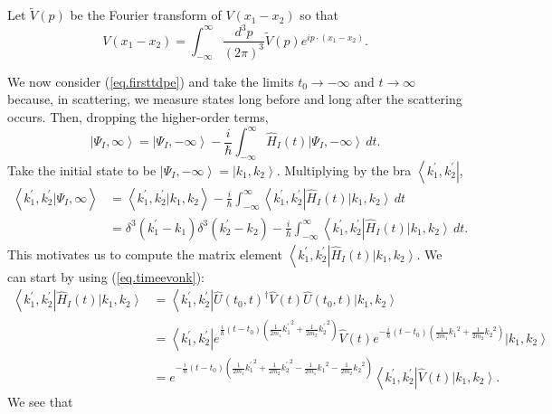 \documentclass[11pt]{article}
\newcommand{\bra}[1]{\left\langle#1\right|}
\newcommand{\ket}[1]{\left|#1\right\rangle}
\newcommand{\braket}[2]{\left\langle#1|#2\right\rangle}
\newcommand{\op}[1]{\hat{#1}}
\theoremstyle{theorem}
\theoremstyle{remark}
\theoremstyle{step}
\theoremstyle{gap}
\begin{document}
Let \(\widetilde{V}(p)\) be the Fourier transform of \(V(x_1 - x_2)\) so that
\begin{equation}
\label{eq.ftV}
V(x_1 - x_2) = \int_{-\infty}^{\infty} \frac{d^3 p}{(2 \pi)^3} \widetilde{V}(p) e^{ip\cdot(x_1 - x_2)}.
\end{equation}

We now consider (\ref{eq.firsttdpe}) and take the limits \(t_0 \to -\infty\) and \(t \to \infty\) because, in scattering, we measure states long before and long after the scattering occurs. Then, dropping the higher-order terms,
\[
\ket{\Psi_I, \infty} = \ket{\Psi_I, -\infty} - \frac{i}{\hbar} \int_{-\infty}^\infty \op{H}_I(t)\ket{\Psi_I, -\infty} \,dt.
\]
Take the initial state to be \(\ket{\Psi_I, -\infty} = \ket{k_1, k_2}\). Multiplying by the bra \(\bra{k_1^\prime, k_2^\prime}\),
\begin{align}
\braket{k_1^\prime, k_2^\prime}{\Psi_I, \infty} &= \braket{k_1^\prime, k_2^\prime}{k_1, k_2} - \frac{i}{\hbar} \int_{-\infty}^\infty \bra{k_1^\prime, k_2^\prime} \op{H}_I(t)\ket{k_1, k_2} \,dt \nonumber\\
&= \delta^3(k_1^\prime - k_1)\delta^3(k_2^\prime - k_2) - \frac{i}{\hbar} \int_{-\infty}^\infty \bra{k_1^\prime, k_2^\prime} \op{H}_I(t)\ket{k_1, k_2} \,dt. \label{eq.intermed}
\end{align}
This motivates us to compute the matrix element \(\bra{k_1^\prime, k_2^\prime} \op{H}_I(t)\ket{k_1, k_2}\). We can start by using (\ref{eq.timeevonk}):
\begin{align*}
\bra{k_1^\prime, k_2^\prime} \op{H}_I(t)\ket{k_1, k_2}
&= \bra{k_1^\prime, k_2^\prime} \op{U}(t_0, t)^\dagger \op{V}(t) \op{U}(t_0, t) \ket{k_1, k_2} \nonumber\\
&= \bra{k_1^\prime, k_2^\prime} e^{\frac{i}{\hbar}\left(t-t_0\right)\left(\frac{1}{2m_1}{k_1^\prime}^2 + \frac{1}{2m_2}{k_2^\prime}^2\right)} \op{V}(t) e^{-\frac{i}{\hbar}\left(t-t_0\right)\left(\frac{1}{2m_1}{k_1}^2 + \frac{1}{2m_2}{k_2}^2\right)} \ket{k_1, k_2} \nonumber\\
&= e^{-\frac{i}{\hbar}\left(t-t_0\right)\left(\frac{1}{2m_1}{k_1^\prime}^2 + \frac{1}{2m_2}{k_2^\prime}^2 - \frac{1}{2m_1}{k_1}^2 - \frac{1}{2m_2}{k_2}^2\right)} \bra{k_1^\prime, k_2^\prime} \op{V}(t) \ket{k_1, k_2}.
\end{align*}
We see that
\end{document}
